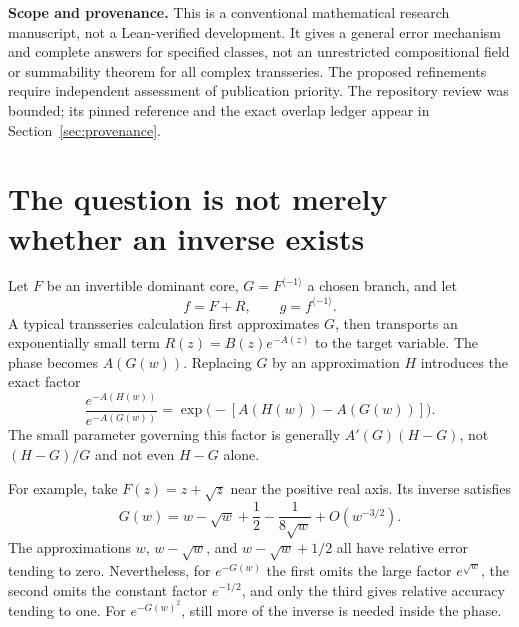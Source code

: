 \documentclass[11pt,a4paper]{article}
\theoremstyle{definition}
\theoremstyle{remark}
\newcommand{\rev}{^{\langle-1\rangle}}
\newcommand{\sect}[1]{Section~\ref{#1}}
\numberwithin{equation}{section}
\begin{document}
\begin{titlepage}
\begin{abstract}
These results are connected to a general differential-algebraic Lagrange formula, a convergent mixed-sector inverse expansion, exact sectorial jump transport, curved decay boundaries, and obstructions for countably many actions. All substantive new claims are proved under explicit hypotheses. Classical inversion and resurgent-closure theorems, and the repository's pre-existing Newton depth and Stokes transport results, are credited rather than claimed as new. Exact symbolic checks and high-precision diagnostics accompany the article.
\end{abstract}
\vfill
\noindent\begin{minipage}{\textwidth}\small
\textbf{Scope and provenance.} This is a conventional mathematical research manuscript, not a Lean-verified development. It gives a general error mechanism and complete answers for specified classes, not an unrestricted compositional field or summability theorem for all complex transseries. The proposed refinements require independent assessment of publication priority. The repository review was bounded; its pinned reference and the exact overlap ledger appear in \sect{sec:provenance}.
\end{minipage}
\end{titlepage}
\begingroup
\small
\setlength{\parskip}{0pt}
\tableofcontents
\endgroup
\clearpage

\section{The question is not merely whether an inverse exists}\label{sec:intro}

Let $F$ be an invertible dominant core, $G=F\rev$ a chosen branch, and let
\begin{equation}\label{eq:corefull}
 f=F+R,\qquad g=f\rev.
\end{equation}
A typical transseries calculation first approximates $G$, then transports an exponentially small term $R(z)=B(z)e^{-A(z)}$ to the target variable. The phase becomes $A(G(w))$. Replacing $G$ by an approximation $H$ introduces the exact factor
\begin{equation}\label{eq:ratio-basic}
 \frac{e^{-A(H(w))}}{e^{-A(G(w))}}
 =\exp\bigl(-[A(H(w))-A(G(w))]\bigr).
\end{equation}
The small parameter governing this factor is generally $A'(G)(H-G)$, not $(H-G)/G$ and not even $H-G$ alone.

For example, take $F(z)=z+\sqrt z$ near the positive real axis. Its inverse satisfies
\[
 G(w)=w-\sqrt w+\frac12-\frac1{8\sqrt w}+O(w^{-3/2}).
\]
The approximations $w$, $w-\sqrt w$, and $w-\sqrt w+1/2$ all have relative error tending to zero. Nevertheless, for $e^{-G(w)}$ the first omits the large factor $e^{\sqrt w}$, the second omits the constant factor $e^{-1/2}$, and only the third gives relative accuracy tending to one. For $e^{-G(w)^2}$, still more of the inverse is needed inside the phase.
\end{document}
